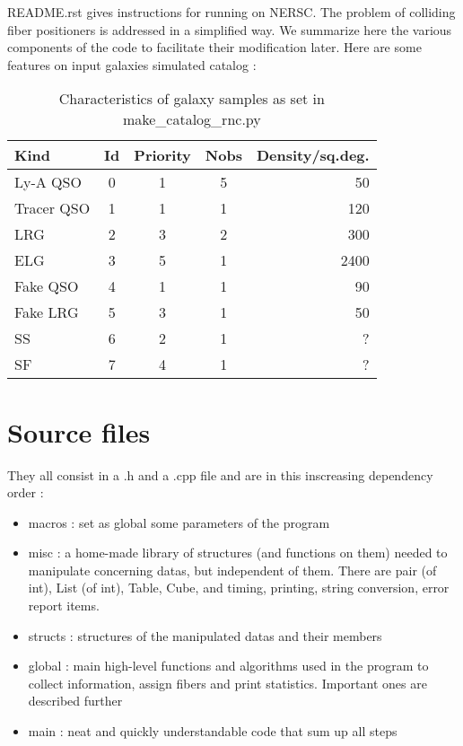 \documentclass[10pt]{extarticle}
\begin{document}
\begin{multicols}{2}
  
  README.rst gives instructions for running on NERSC.  The problem of colliding fiber positioners is addressed in a simplified way. 
  We summarize here the various components of the code to facilitate their modification later.
Here are some features on input galaxies simulated catalog :

\begin{table}[H]\begin{center}
	\caption{Characteristics of galaxy samples as set in make\_catalog\_rnc.py}\label{tab:characteristics}
	\begin{tabular}{lcccr}\\ \hline
		Kind&Id&Priority&Nobs&Density/sq.deg.\\ \hline
		Ly-A QSO & 0 & 1 & 5 &  50\\
		Tracer QSO & 1 & 1 & 1& 120\\
		LRG & 2 & 3 &2 & 300\\
		ELG & 3 & 5 & 1 & 2400\\
		Fake QSO & 4 & 1 & 1& 90\\
		Fake LRG & 5 & 3 & 1 & 50\\
		SS & 6 & 2 & 1&  ?\\
		SF & 7 & 4 & 1& ?\\ \hline
	\end{tabular}\end{center}
\end{table}


\section{Source files}
They all consist in a .h and a .cpp file and are in this inscreasing dependency order :
\begin{itemize} 
	\item macros : set as global some parameters of the program
	\item misc : a home-made library of structures (and functions on them) needed to manipulate concerning datas, but independent of them. There are pair (of int), List (of int), Table, Cube, and timing, printing, string conversion, error report items.
	\item structs : structures of the manipulated datas and their members
	\item global : main high-level functions and algorithms used in the program to collect information, assign fibers and print statistics. Important ones are described further
	\item main : neat and quickly understandable code that sum up all steps
\end{itemize} 


\end{multicols}
\end{document}
